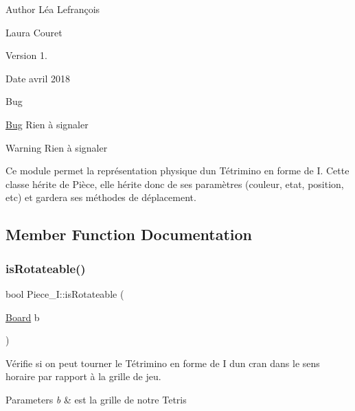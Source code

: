 \begin{DoxyAuthor}{Author}
Léa Lefrançois 

Laura Couret 
\end{DoxyAuthor}
\begin{DoxyVersion}{Version}
1. 
\end{DoxyVersion}
\begin{DoxyDate}{Date}
avril 2018 
\end{DoxyDate}
\begin{DoxyRefDesc}{Bug}
\item[\hyperlink{bug__bug000009}{Bug}]Rien à signaler \end{DoxyRefDesc}
\begin{DoxyWarning}{Warning}
Rien à signaler
\end{DoxyWarning}
Ce module permet la représentation physique d\textquotesingle{}un Tétrimino en forme de I. Cette classe hérite de Pièce, elle hérite donc de ses paramètres (couleur, etat, position, etc) et gardera ses méthodes de déplacement. 

\subsection{Member Function Documentation}
\mbox{\label{classPiece__I_aec103ce64d2702bf3dc5dbcdb8b450eb}} 
\subsubsection{\texorpdfstring{is\+Rotateable()}{isRotateable()}}
{\footnotesize\ttfamily bool Piece\+\_\+\+I\+::is\+Rotateable (\begin{DoxyParamCaption}\item[{\hyperlink{classBoard}{Board}}]{b }\end{DoxyParamCaption})\hspace{0.3cm}{\ttfamily [virtual]}}



Vérifie si on peut tourner le Tétrimino en forme de I d\textquotesingle{}un cran dans le sens horaire par rapport à la grille de jeu. 


\begin{DoxyParams}{Parameters}
{\em b} & est la grille de notre Tetris \\
\hline
\end{DoxyParams}


